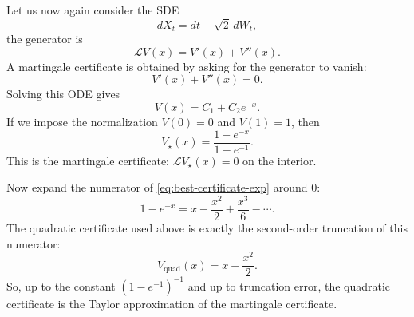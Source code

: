 Let us now again consider the SDE
\begin{equation}
    dX_t=dt+\sqrt 2\,dW_t,
\end{equation}
the generator is
\begin{equation}
    \mathcal L V(x)=V'(x)+V''(x).
\end{equation}
A martingale certificate is obtained by asking for the generator to vanish:
\begin{equation}
    V'(x)+V''(x)=0.
    \label{eq:martingale-certificate-ode}
\end{equation}
Solving this ODE gives
\begin{equation}
    V(x)=C_1+C_2 e^{-x}.
\end{equation}
If we impose the normalization $V(0)=0$ and $V(1)=1$, then
\begin{equation}
    V_\star(x)
    =
    \frac{1-e^{-x}}{1-e^{-1}}.
    \label{eq:best-certificate-exp}
\end{equation}
This is the martingale certificate: $\mathcal L V_\star(x)=0$ on the interior.

Now expand the numerator of \eqref{eq:best-certificate-exp} around $0$:
\begin{equation}
    1-e^{-x}
    =
    x-\frac{x^2}{2}+\frac{x^3}{6}-\cdots .
\end{equation}
The quadratic certificate used above is exactly the second-order truncation of
this numerator:
\begin{equation}
    V_{\mathrm{quad}}(x)
    =
    x-\frac{x^2}{2}.
\end{equation}
So, up to the constant $(1-e^{-1})^{-1}$ and up to truncation
error, the quadratic certificate is the Taylor approximation of the martingale
certificate.
